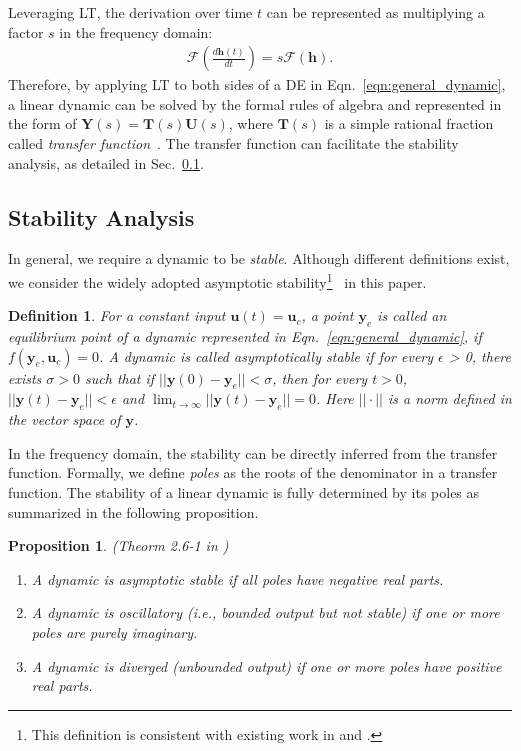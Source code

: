 \documentclass{article}
\newcommand{\F}{\mathcal{F}}
\newcommand{\ty}{\bm{y}}
\newcommand{\tu}{\bm{u}}
\newcommand{\tth}{\bm{h}}
\newcommand{\fY}{\bm{Y}}
\newcommand{\fU}{\bm{U}}
\newcommand{\fT}{\bm{T}}
\newcommand{\eqn}[1]{Eqn.~\eqref{eqn:#1}}
\newcommand{\secref}[1]{Sec.~\ref{sec:#1}} \usepackage{wrapfig}
\newtheorem{prop}{Proposition}
\newtheorem{definition}{Definition}
\theoremstyle{definition}
\begin{document}
Leveraging LT, the derivation over time $t$ can be represented as multiplying a factor $s$ in the frequency domain:
\begin{align}
\F(\frac{d\tth(t)}{dt}) = s \F(\tth).
\end{align}
Therefore, by applying LT to both sides of a DE in \eqn{general_dynamic}, a linear dynamic can be solved by the formal rules of algebra and represented in the form of $\fY(s) = \fT(s)\fU(s)$, where $\fT(s)$ is a simple rational fraction called {\it transfer function}~\cite{kailath1980linear}.
The transfer function can facilitate the stability analysis, as detailed in \secref{stability_analysis}.









\subsection{Stability Analysis}
\label{sec:stability_analysis}

In general, we require a dynamic to be {\it stable}. Although different definitions exist, we consider the widely adopted asymptotic stability\footnote{This definition is consistent with existing work in \citet{mescheder2017numerics} and \citet{mescheder2018training}.}~\cite{kailath1980linear} in this paper.
\begin{definition}
	For a constant input $\tu(t) = \tu_c$, a point $\ty_e$ is called an equilibrium point of a dynamic represented in \eqn{general_dynamic}, if $f(\ty_e, \tu_c) = 0$. A dynamic is called asymptotically stable if for every $\epsilon$ > 0, there exists $\sigma > 0$ such that if $||\ty(0) - \ty_e|| < \sigma$, then for every $t>0$, $||\ty(t) - \ty_e|| < \epsilon$ and $\lim_{t\to \infty} ||\ty(t) - \ty_e|| = 0$. Here $||\cdot||$ is a norm defined in the vector space of $\ty$.
\end{definition}


In the frequency domain, the stability can be directly inferred from the transfer function. Formally, we define {\it poles} as the roots of the denominator in a transfer function. The stability of a linear dynamic is fully determined by its poles as summarized in the following proposition.\newpage

\begin{prop}(Theorm 2.6-1 in \citet{kailath1980linear})
\vspace{-.15cm}
\begin{enumerate}
	\setlength\itemsep{-2pt}
	\item A dynamic is asymptotic stable if all poles have negative real parts.
	\item A dynamic is oscillatory (i.e., bounded output but not stable) if one or more poles are purely imaginary.
	\item A dynamic is diverged (unbounded output) if one or more poles have positive real parts.
\end{enumerate}
\label{prop_stability}
\end{prop}
\end{document}

